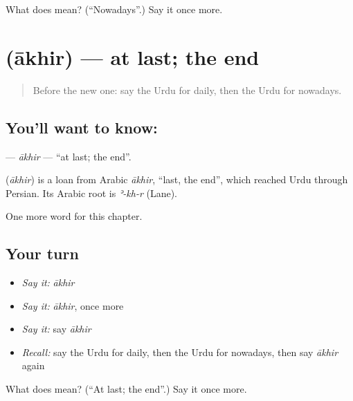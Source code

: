 \begin{tcolorbox}[breakable,colback=teal!4,colframe=teal!35!black,title={Before you move on}]
What does   mean? (\textquotedblleft{}Nowadays\textquotedblright{}.) Say it once more.
\end{tcolorbox}
\section[\texorpdfstring{\ur{آخر} (ākhir)}{آخر (ākhir)}]{ (ākhir) — at last; the end}

\label{lesson:UR-C245-akhir}



\begin{quote}
Before the new one: say the Urdu for daily, then the Urdu for nowadays.
\end{quote}

\subsection*{You'll want to know: }
\textbf{} — \emph{ākhir} — \textquotedblleft{}at last; the end\textquotedblright{}.

\begin{cousinweb}
\textbf{} (\emph{ākhir}) is a loan from Arabic \emph{ākhir}, \textquotedblleft{}last, the end\textquotedblright{}, which reached Urdu through Persian. Its Arabic root is \emph{ʾ-kh-r} (Lane).
\end{cousinweb}

\begin{grammarlens}[title={What you've built}]
One more word for this chapter.
\end{grammarlens}

\subsection*{Your turn}
\begin{itemize}
\raggedright
  \item \emph{Say it:} \emph{ākhir}
  \item \emph{Say it:} \emph{ākhir}, once more
  \item \emph{Say it:} say \emph{ākhir}
  \item \emph{Recall:} say the Urdu for daily, then the Urdu for nowadays, then say \emph{ākhir} again
\end{itemize}

\begin{tcolorbox}[breakable,colback=teal!4,colframe=teal!35!black,title={Before you move on}]
What does  mean? (\textquotedblleft{}At last; the end\textquotedblright{}.) Say it once more.
\end{tcolorbox}
